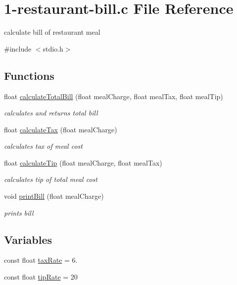 \hypertarget{1-restaurant-bill_8c}{}\section{1-\/restaurant-\/bill.c File Reference}
\label{1-restaurant-bill_8c}


calculate bill of restaurant meal  


{\ttfamily \#include $<$stdio.\+h$>$}\newline
\subsection*{Functions}
\begin{DoxyCompactItemize}
\item 
float \mbox{\hyperlink{1-restaurant-bill_8c_ace46b54ff807608cb79c5f2cef5fa28c}{calculate\+Total\+Bill}} (float meal\+Charge, float meal\+Tax, float meal\+Tip)
\begin{DoxyCompactList}\small\item\em calculates and returns total bill \end{DoxyCompactList}\item 
float \mbox{\hyperlink{1-restaurant-bill_8c_a6b24de031ca99a0780eb38f582ce99ed}{calculate\+Tax}} (float meal\+Charge)
\begin{DoxyCompactList}\small\item\em calculates tax of meal cost \end{DoxyCompactList}\item 
float \mbox{\hyperlink{1-restaurant-bill_8c_a4ada15172b3913664688ef59b515fb33}{calculate\+Tip}} (float meal\+Charge, float meal\+Tax)
\begin{DoxyCompactList}\small\item\em calculates tip of total meal cost \end{DoxyCompactList}\item 
void \mbox{\hyperlink{1-restaurant-bill_8c_a3214f6478ed42eb1a47db94e819f7392}{print\+Bill}} (float meal\+Charge)
\begin{DoxyCompactList}\small\item\em prints bill \end{DoxyCompactList}\end{DoxyCompactItemize}
\subsection*{Variables}
\begin{DoxyCompactItemize}
\item 
const float \mbox{\hyperlink{1-restaurant-bill_8c_ab2b5bf2df03f8134d13507cdd670ae4a}{tax\+Rate}} = 6.
\item 
const float \mbox{\hyperlink{1-restaurant-bill_8c_adc4b3b209191d0aeaaac20d955026fcd}{tip\+Rate}} = 20
\end{DoxyCompactItemize}


